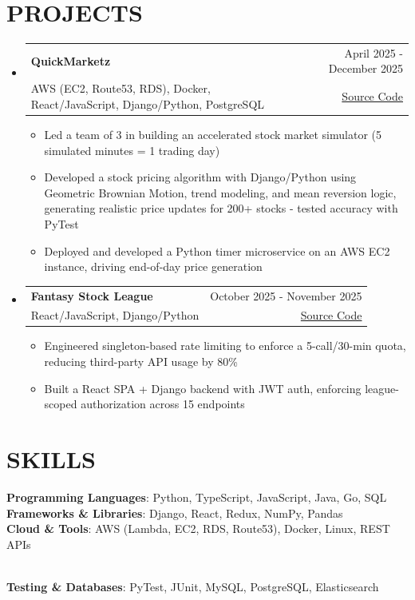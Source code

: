 \documentclass[letterpaper,11pt]{article}
\makeatletter
\newcommand{\resumeItem}[1]{
  \item\small{
    {#1 \vspace{-2pt}}
  }
}
\newcommand{\resumeProjectHeading}[4]{
  \vspace{-2pt}\item
    \begin{tabular*}{1\textwidth}[t]{l@{\extracolsep{\fill}}r}
      \textbf{#1} & #2 \\
      {\small#3} & {\small #4} \\
    \end{tabular*}\vspace{-7pt}
}
\newcommand{\resumeSubHeadingListStart}{\begin{itemize}[leftmargin=0in, label={}]}
\newcommand{\resumeSubHeadingListEnd}{\end{itemize}}
\newcommand{\resumeItemListStart}{\begin{itemize}}
\newcommand{\resumeItemListEnd}{\end{itemize}\vspace{-4pt}}
\makeatother
\begin{document}
\section{PROJECTS}
  \resumeSubHeadingListStart
    \resumeProjectHeading
      {QuickMarketz}
      {April 2025 - December 2025}
      {AWS (EC2, Route53, RDS), Docker, React/JavaScript, Django/Python, PostgreSQL}
      {\href{https://github.com/MichaelAho1/QuickMarkets}{Source Code}}
      \resumeItemListStart
        \resumeItem{Led a team of 3 in building an accelerated stock market simulator  (5 simulated minutes = 1 trading day)}
        \resumeItem{Developed a stock pricing algorithm with Django/Python using Geometric Brownian Motion, trend modeling, and mean reversion logic, generating realistic price updates for 200+ stocks - tested accuracy with PyTest}
        \resumeItem{Deployed and developed a Python timer microservice on an AWS EC2 instance, driving end-of-day price generation}
      \resumeItemListEnd
      
    \resumeProjectHeading
      {Fantasy Stock League}
      {October 2025 - November 2025}
      {React/JavaScript, Django/Python}
    {\href{https://github.com/MichaelAho1/FantasyStockLeague}{Source Code}}
      \resumeItemListStart
        \resumeItem{Engineered singleton-based rate limiting to enforce a 5-call/30-min quota, reducing third-party API usage by 80\%}
        \resumeItem{Built a React SPA + Django backend with JWT auth, enforcing league-scoped authorization across 15 endpoints}
      \resumeItemListEnd  
    \resumeSubHeadingListEnd

\section{SKILLS}
 \begin{itemize}[leftmargin=0in, label={}]
    \small{\item{
     \textbf{Programming Languages}{: Python, TypeScript, JavaScript, Java, Go, SQL} \\
     \textbf{Frameworks \& Libraries}{: Django, React, Redux, NumPy, Pandas} \\
    \textbf{Cloud \& Tools}{: AWS (Lambda, EC2, RDS, Route53), Docker, Linux, REST APIs} }} \\
    \textbf{Testing \& Databases}{: PyTest, JUnit, MySQL, PostgreSQL, Elasticsearch} 
 \end{itemize}
\end{document}
